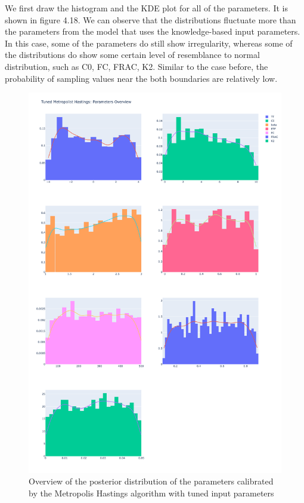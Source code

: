 We first draw the histogram and the KDE plot for all of the parameters. It is shown in figure 4.18. We can observe that the distributions fluctuate more than the parameters from the model that uses the knowledge-based input parameters. In this case, some of the parameters do still show irregularity, whereas some of the distributions do show some certain level of resemblance to normal distribution, such as C0, FC, FRAC, K2. Similar to the case before, the probability of sampling values near the both boundaries are relatively low. 

\begin{figure}
    \centering
    \includegraphics[width=1\textwidth]{figures/basic_mh/tuned_mh/tuned_mh_parameters_overview.png}
    \captionsetup{width=.8\textwidth}
    \caption{Overview of the posterior distribution of the parameters calibrated by the Metropolis Hastings algorithm with tuned input parameters}
    \label{fig:enter-label}
\end{figure}


